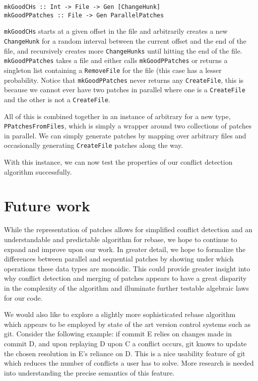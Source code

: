 \documentclass[]{article}
\begin{document}
\begin{verbatim}
mkGoodCHs :: Int -> File -> Gen [ChangeHunk]
mkGoodPPatches :: File -> Gen ParallelPatches
\end{verbatim}

\texttt{mkGoodCHs} starts at a given offset in the file and arbitrarily
creates a new \texttt{ChangeHunk} for a random interval between the
current offset and the end of the file, and recursively creates more
\texttt{ChangeHunks} until hitting the end of the file.
\texttt{mkGoodPPatches} takes a file and either calls
\texttt{mkGoodPPatches} or returns a singleton list containing a
\texttt{RemoveFile} for the file (this case has a lesser probability.
Notice that \texttt{mkGoodPPatches} never returns any
\texttt{CreateFile}, this is because we cannot ever have two patches in
parallel where one is a \texttt{CreateFile} and the other is not a
\texttt{CreateFile}.

All of this is combined together in an instance of arbitrary for a new
type, \texttt{PPatchesFromFiles}, which is simply a wrapper around two
collections of patches in parallel. We can simply generate patches by
mapping over arbitrary files and occasionally generating
\texttt{CreateFile} patches along the way.

With this instance, we can now test the properties of our conflict
detection algorithm successfully.

\section{Future work}

While the representation of patches allows for simplified conflict
detection and an understandable and predictable algorithm for rebase, we
hope to continue to expand and improve upon our work. In greater detail,
we hope to formalize the differences between parallel and sequential
patches by showing under which operations these data types are monoidic.
This could provide greater insight into why conflict detection and
merging of patches appears to have a great disparity in the complexity
of the algorithm and illuminate further testable algebraic laws for our
code.

We would also like to explore a slightly more sophisticated rebase
algorithm which appears to be employed by state of the art version
control systems such as git. Consider the following example: if commit E
relies on changes made in commit D, and upon replaying D upon C a
conflict occurs, git knows to update the chosen resolution in E's
reliance on D. This is a nice usability feature of git which reduces the
number of conflicts a user has to solve. More research is needed into
understanding the precise semantics of this feature.
\end{document}
